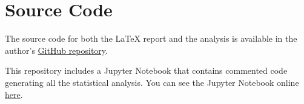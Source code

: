\section{Source Code}

The source code for both the LaTeX report and the analysis is available in the author's
\href{https://github.com/lexotero/kcl-7CCSONAR-analysis-and-reporting}{GitHub repository}.

This repository includes a Jupyter Notebook that contains commented code generating all the statistical analysis. You can
see the Jupyter Notebook online \href{https://github.com/lexotero/kcl-7CCSONAR-analysis-and-reporting/blob/main/src/notebook.ipynb}{here}.